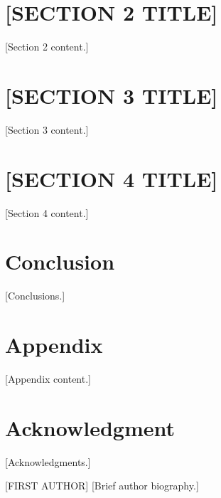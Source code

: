 \documentclass[journal]{IEEEtran}
\begin{document}
\section{[SECTION 2 TITLE]}
\label{sec:section2}

[Section 2 content.]


\section{[SECTION 3 TITLE]}
\label{sec:section3}

[Section 3 content.]


\section{[SECTION 4 TITLE]}
\label{sec:section4}

[Section 4 content.]


\section{Conclusion}
\label{sec:conclusion}

[Conclusions.]


\appendices
\section{Appendix}
[Appendix content.]


\section*{Acknowledgment}

[Acknowledgments.]






\begin{IEEEbiographynophoto}{[FIRST AUTHOR]}
[Brief author biography.]
\end{IEEEbiographynophoto}
\end{document}

